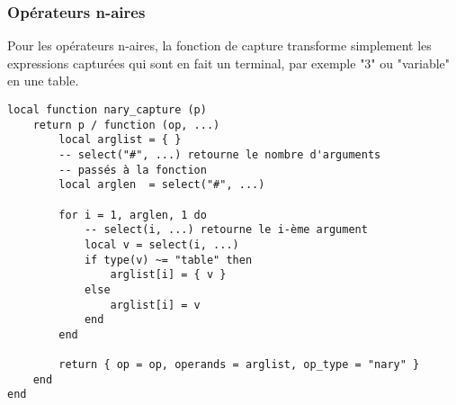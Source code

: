 \documentclass{article}
\begin{document}
\subsubsection{Opérateurs n-aires}
Pour les opérateurs n-aires, la fonction de capture transforme simplement les expressions capturées qui sont en fait un terminal, par exemple "3" ou "variable" en une table.
\begin{verbatim}
local function nary_capture (p)
	return p / function (op, ...)
		local arglist = { }
		-- select("#", ...) retourne le nombre d'arguments
		-- passés à la fonction
		local arglen  = select("#", ...)

		for i = 1, arglen, 1 do
			-- select(i, ...) retourne le i-ème argument
			local v = select(i, ...)
			if type(v) ~= "table" then
				arglist[i] = { v }
			else
				arglist[i] = v
			end
		end

		return { op = op, operands = arglist, op_type = "nary" }
	end
end
\end{verbatim}
\end{document}
